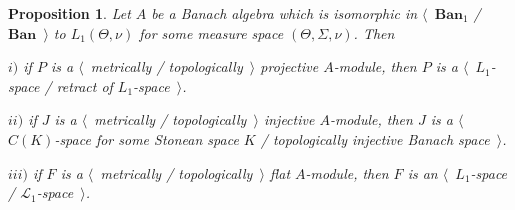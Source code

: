 \documentclass[12pt]{article}
\newtheorem{proposition}[theorem]{Proposition}
\begin{document}
\begin{proposition}\label{TopProjInjFlatModOverL1Charac} Let $A$ be a Banach algebra which is isomorphic in $\langle$~$\mathbf{Ban}_1$ / $\mathbf{Ban}$~$\rangle$ to $L_1(\Theta,\nu)$ for some measure space $(\Theta,\Sigma,\nu)$. Then

$i)$ if $P$ is a $\langle$~metrically / topologically~$\rangle$ projective $A$-module, then $P$ is a $\langle$~$L_1$-space / retract of $L_1$-space~$\rangle$.

$ii)$ if $J$ is a $\langle$~metrically / topologically~$\rangle$ injective $A$-module, then  $J$ is a $\langle$~$C(K)$-space for some Stonean space $K$ / topologically injective Banach space~$\rangle$.

$iii)$ if $F$ is a $\langle$~metrically / topologically~$\rangle$ flat $A$-module, then $F$ is an $\langle$~$L_1$-space / $\mathscr{L}_1$-space~$\rangle$.
\end{proposition}
\end{document}
